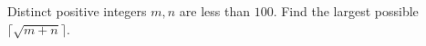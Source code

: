 Distinct positive integers $m,n$ are less than $100$. Find the largest possible $\lceil\sqrt{m+n}\rceil$.
